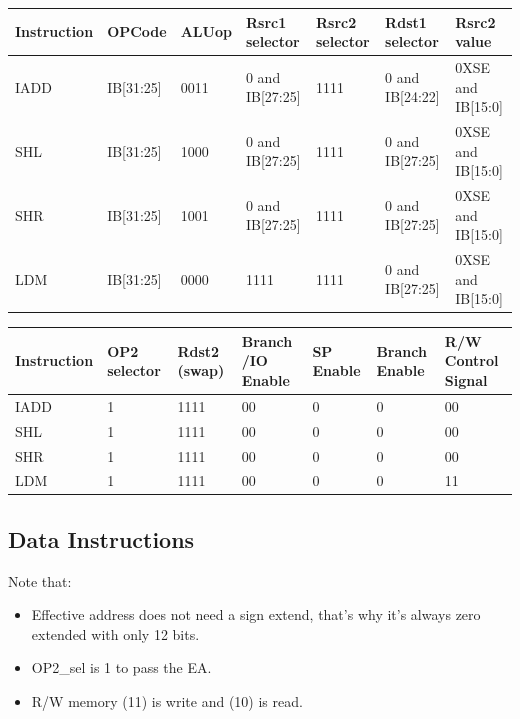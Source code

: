 \documentclass[12pt]{report}
\begin{document}
\begin{center}
\begin{tabular}{||p{20mm}| p{15mm}| p{15mm}| p{15mm}| p{15mm}| p{15mm}| p{15mm}||} 
\hline
Instruction & OPCode & ALUop & Rsrc1 selector & Rsrc2 selector & Rdst1 selector & Rsrc2 value  \\ [0.5ex] 
\hline\hline
IADD& IB[31:25] & 0011 & 0 and IB[27:25] & 1111 & 0 and IB[24:22] & 0XSE and IB[15:0] \\
\hline
SHL & IB[31:25] & 1000 & 0 and IB[27:25] & 1111 & 0 and IB[27:25] & 0XSE and IB[15:0] \\
\hline
SHR & IB[31:25] & 1001 & 0 and IB[27:25] & 1111 & 0 and IB[27:25] & 0XSE and IB[15:0] \\
\hline
LDM & IB[31:25] & 0000 & 1111 & 1111 & 0 and IB[27:25] & 0XSE and IB[15:0] \\
\hline
\end{tabular}
\end{center}

\begin{center}
\begin{tabular}{||p{20mm}| p{15mm}| p{15mm}| p{15mm}| p{15mm}| p{15mm}| p{15mm}||} 
\hline
Instruction & OP2 selector & Rdst2 (swap) & Branch /IO Enable & SP Enable & Branch Enable & R/W Control Signal  \\ [0.5ex] 
\hline\hline
IADD & 1 & 1111 & 00 & 0 & 0 & 00  \\
\hline
SHL & 1 & 1111 & 00 & 0 & 0 & 00 \\
\hline
SHR & 1 & 1111 & 00 & 0 & 0 & 00 \\
\hline
LDM & 1 & 1111 & 00 & 0 & 0 & 11 \\
\hline
\end{tabular}
\end{center}

\subsection{Data Instructions}
Note that:
\begin{itemize}
    \item Effective address does not need a sign extend, that's why it's always zero extended with only 12 bits.
    \item OP2\_sel is 1 to pass the EA.
    \item R/W memory (11) is write and (10) is read.
\end{itemize}
\end{document}
